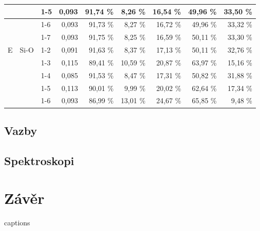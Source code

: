 \documentclass[
  digital, %
  table,   %
  lof,     %
  lot,     %
  oneside,
]{fithesis3}
\begin{document}
\begin{table}[htbp]
\begin{center}
\begin{tabular}{|l|l|l|r|r|r|r|r|r|}
 &  & 1-5  & 0,093 & 91,74 \% & 8,26 \% & 16,54 \% & 49,96 \% & 33,50 \% \\ \hline
 &  & 1-6 & 0,093 & 91,73 \% & 8,27 \% & 16,72 \% & 49,96 \% & 33,32 \% \\ \hline
 &  & 1-7 & 0,093 & 91,75 \% & 8,25 \% & 16,59 \% & 50,11 \% & 33,30 \% \\ \hline
E & Si-O & 1-2  & 0,091 & 91,63 \% & 8,37 \% & 17,13 \% & 50,11 \% & 32,76 \% \\ \hline
 &  & 1-3  & 0,115 & 89,41 \% & 10,59 \% & 20,87 \% & 63,97 \% & 15,16 \% \\ \hline
 &  & 1-4  & 0,085 & 91,53 \% & 8,47 \% & 17,31 \% & 50,82 \% & 31,88 \% \\ \hline
 &  & 1-5  & 0,113 & 90,01 \% & 9,99 \% & 20,02 \% & 62,64 \% & 17,34 \% \\ \hline
 &  & 1-6 & 0,093 & 86,99 \% & 13,01 \% & 24,67 \% & 65,85 \% & 9,48 \% \\ \hline
\end{tabular}
\end{center}
\label{nbo_large}
\end{table}



\section{Vazby}

\section{Spektroskopi}












\chapter{Závěr}


{\csname captions\languagename\endcsname %
\makeatletter %
  \thesis@selectLocale{\thesis@locale}\makeatother
\printbibliography[heading=bibintoc]} %
\appendix %
\end{document}
